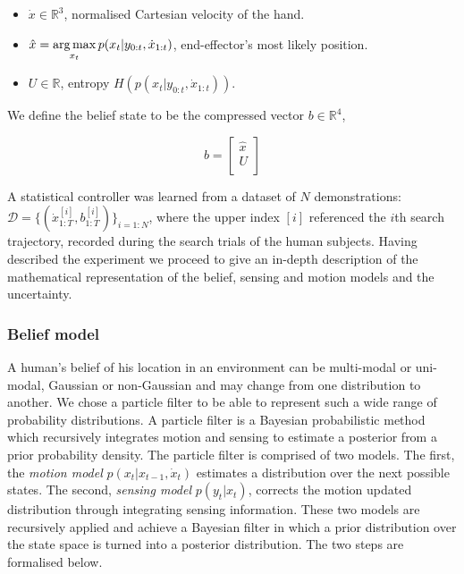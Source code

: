 \begin{itemize}
 \item $\dot{x} \in \mathbb{R}^{3}$, normalised Cartesian velocity of the hand.
 \item $\hat{x} = \operatorname*{arg\,max}\limits_{x_t} p(x_{t}|y_{0:t},\dot{x}_{1:t})$, end-effector's most likely position.
 \item $U \in \mathbb{R}$, entropy $H\left(p(x_{t}|y_{0:t},\dot{x}_{1:t})\right)$.
\end{itemize}
We define the belief state to be the compressed vector $b \in \mathbb{R}^4$,

\begin{equation}
 b = \begin{bmatrix}
       \hat{x} \\[0.3em]
       U       \\[0.3em]
     \end{bmatrix}
\end{equation}


A statistical controller was learned from a dataset of $N$ demonstrations: ${\mathcal{D} = \{(\dot{x}^{[i]}_{1:T},b^{[i]}_{1:T})\}_{i=1:N}}$, where the upper index $[i]$
referenced the $i$th search trajectory, recorded during the search trials of the human subjects. Having described the experiment we proceed to give an in-depth description 
of the mathematical representation of the belief, sensing and motion models and the uncertainty. 


\subsubsection{Belief model}


A human's belief of his location in an environment can be multi-modal or uni-modal, Gaussian or non-Gaussian and may change from one distribution to another. 
We chose a particle filter to be able to represent such a wide range of probability distributions. A particle filter is a Bayesian probabilistic method 
which recursively integrates motion and sensing to estimate a posterior from a prior probability density. The particle filter is comprised of two models.
The first, the \textit{motion model} $p(x_{t}|x_{t-1},\dot{x}_{t})$ estimates a distribution over the next possible states. The second, \textit{sensing model} 
$p(y_{t}|x_{t})$, corrects the motion updated distribution through integrating sensing information. These two models are recursively applied and achieve a Bayesian filter in which a prior distribution 
over the state space is turned into a posterior distribution. The two steps are formalised below.

